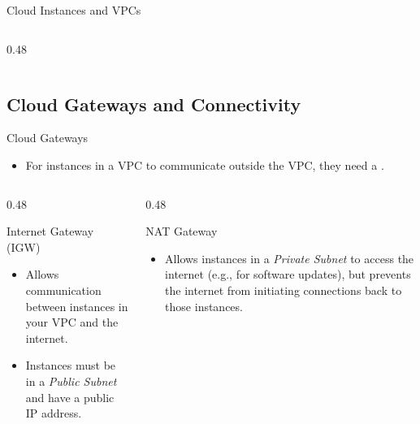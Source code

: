 \documentclass[aspectratio=169]{beamer}  %
\begin{document}
\begin{frame}[t]{Cloud Instances and VPCs}
\begin{columns}[T]
\begin{column}{0.48\textwidth}
\begin{center}
            \end{center}
        \end{column}
    \end{columns}
\end{frame}

\subsection{Cloud Gateways and Connectivity}
\begin{frame}[t]{Cloud Gateways}
    \begin{itemize}
        \item For instances in a VPC to communicate outside the VPC, they need a .
    \end{itemize}
    \vspace{0.3em}
    \begin{columns}[T]
        \begin{column}{0.48\textwidth}
            \begin{block}{Internet Gateway (IGW)}
                \footnotesize
                \begin{itemize}
                    \item Allows communication between instances in your VPC and the internet.
                    \item Instances must be in a \textit{Public Subnet} and have a public IP address.
                \end{itemize}
            \end{block}
        \end{column}
        \begin{column}{0.48\textwidth}
            \begin{block}{NAT Gateway}
                \footnotesize
                \begin{itemize}
                    \item Allows instances in a \textit{Private Subnet} to access the internet (e.g., for software updates), but prevents the internet from initiating connections back to those instances.
                \end{itemize}
            \end{block}
        \end{column}
    \end{columns}
\end{frame}
\end{document}
